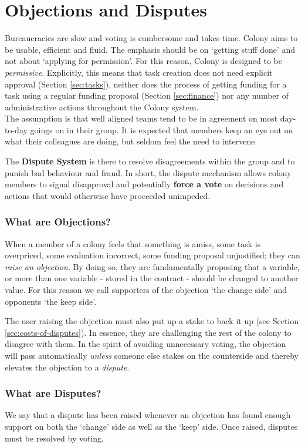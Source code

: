 \section{Objections and Disputes}\label{sec:objections-and-disputes}
Bureaucracies are slow and voting is cumbersome and takes time. Colony aims to be usable, efficient and fluid. The emphasis should be on `getting stuff done' and not about `applying for permission'. For this reason, Colony is designed to be \emph{permissive}. Explicitly, this means that task creation does not need explicit approval (Section \ref{sec:tasks}), neither does the process of getting funding for a task using a regular funding proposal (Section \ref{sec:finance}) nor any number of administrative actions throughout the Colony system.\\
The assumption is that well aligned teams tend to be in agreement on most day-to-day goings on in their group. It is expected that members keep an eye out on what their colleagues are doing, but seldom feel the need to intervene. 

The \textbf{Dispute System} is there to resolve disagreements within the group and to punish bad behaviour and fraud. In short, the dispute mechanism allows colony members to signal disapproval and potentially \textbf{force a vote} on decisions and actions that would otherwise have proceeded unimpeded.


\subsubsection*{What are Objections?}
When a member of a colony feels that something is amiss, some task is overpriced, some evaluation incorrect, some funding proposal unjustified; they can \emph{raise an objection}. By doing so, they are fundamentally proposing that a variable, or more than one variable - stored in the  contract - should be changed to another value. For this reason we call supporters of the objection `the change side' and opponents `the keep side'.

The user raising the objection must also put up a stake to back it up (see Section \ref{sec:costs-of-disputes}). In essence, they are challenging the rest of the colony to disagree with them. In the spirit of avoiding unnecessary voting, the objection will pass automatically \emph{unless} someone else stakes on the counterside and thereby elevates the objection to a \emph{dispute}.

\subsubsection*{What are Disputes?}
We say that a dispute has been raised whenever an objection has found enough support on both the `change' side as well as the `keep' side. Once raised, disputes must be resolved by voting. 

